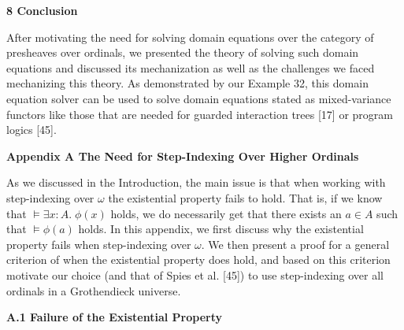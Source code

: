\documentclass[10pt,a4paper]{article}
\begin{document}
 


 
\par\medskip\noindent\textbf{8 Conclusion}\par
 
 
After motivating the need for solving domain equations over the category of presheaves over ordinals, we presented the theory of solving such domain equations and discussed its mechanization as well as the challenges we faced mechanizing this theory. As demonstrated by our Example 32, this domain equation solver can be used to solve domain equations stated as mixed-variance functors like those that are needed for guarded interaction trees [17] or program logics [45].\par
 
 


 
\par\medskip\noindent\textbf{Appendix A The Need for Step-Indexing Over Higher Ordinals}\par
 
 
As we discussed in the Introduction, the main issue is that when working with step-indexing over $\omega$ the existential property fails to hold. That is, if we know that $\models\exists x:A.\;\phi(x)$ holds, we do necessarily get that there exists an $a\in A$ such that $\models\phi(a)$ holds. In this appendix, we first discuss why the existential property fails when step-indexing over $\omega$. We then present a proof for a general criterion of when the existential property does hold, and based on this criterion motivate our choice (and that of Spies et al. [45]) to use step-indexing over all ordinals in a Grothendieck universe.\par
 
 
 
\par\medskip\noindent\textbf{A.1 Failure of the Existential Property}\par
 
 
\end{document}
